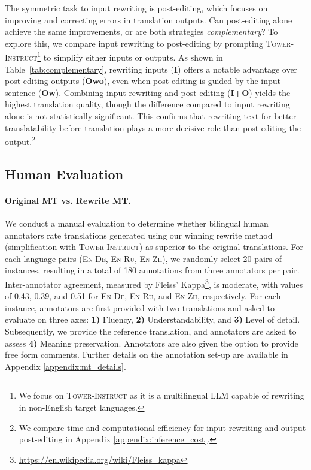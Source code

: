 The symmetric task to input rewriting is post-editing, which focuses on improving and correcting errors in translation outputs. Can post-editing alone achieve the same improvements, or are both strategies \textit{complementary}? To explore this, we compare input rewriting to post-editing by prompting \textsc{Tower-Instruct}\footnote{We focus on \textsc{Tower-Instruct} as it is a multilingual LLM capable of rewriting in non-English target languages.} to simplify either inputs or outputs. As shown in Table~\ref{tab:complementary}, rewriting inputs (\textbf{I}) offers a notable advantage over post-editing outputs (\textbf{Owo}), even when post-editing is guided by the input sentence (\textbf{Ow}). Combining input rewriting and post-editing (\textbf{I+O}) yields the highest translation quality, though the difference compared to input rewriting alone is not statistically significant. This confirms that rewriting text for better translatability before translation plays a more decisive role than post-editing the output.\footnote{We compare time and computational efficiency for input rewriting and output post-editing in Appendix \ref{appendix:inference_cost}.}




\subsection{Human Evaluation}
\label{human evaluation}


\paragraph{Original MT vs. Rewrite MT.}
We conduct a manual evaluation to determine whether bilingual human annotators rate translations generated using our winning rewrite method (simplification with \textsc{Tower-Instruct}) as superior to the original translations. For each language pairs (\textsc{En-De}, \textsc{En-Ru}, \textsc{En-Zh}), we randomly select 20 pairs of instances, resulting in a total of 180 annotations from three annotators per pair. Inter-annotator agreement, measured by Fleiss' Kappa\footnote{\url{https://en.wikipedia.org/wiki/Fleiss_kappa}}, is moderate, with values of 0.43, 0.39, and 0.51 for \textsc{En-De}, \textsc{En-Ru}, and \textsc{En-Zh}, respectively. For each instance, annotators are first provided with two translations and asked to evaluate on three axes: \textbf{1)} Fluency, \textbf{2)} Understandability, and \textbf{3)} Level of detail. Subsequently, we provide the reference translation, and annotators are asked to assess \textbf{4)} Meaning preservation. Annotators are also given the option to provide free form comments. Further details on the annotation set-up are available in Appendix \ref{appendix:mt_details}.

